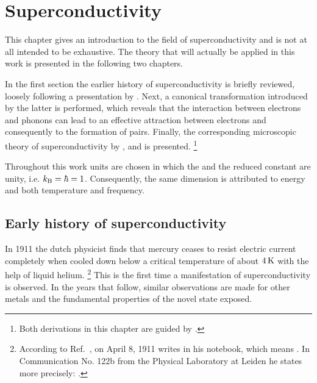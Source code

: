 
\chapter{Superconductivity}
\label{superconductivity}

This chapter gives an introduction to the field of superconductivity and is not
at all intended to be exhaustive. The theory that will actually be applied in
this work is presented in the following two chapters.

In the first section the earlier history of superconductivity is briefly
reviewed, loosely following a presentation by 
\cite{Froehlich82}. Next, a canonical transformation introduced by the latter is
performed, which reveals that the interaction between electrons and phonons can
lead to an effective attraction between electrons and consequently to the
formation of  pairs. Finally, the corresponding microscopic theory
of superconductivity by ,  and  is
presented.%
%
\footnote{Both derivations in this chapter are guided by 
\cite{Czycholl08}.}

Throughout this work units are chosen in which the  and the
reduced  constant are unity, i.e. $k \sb{\text{B}} = \hbar = 1$.
Consequently, the same dimension is attributed to energy and both temperature
and frequency.

\section{Early history of superconductivity}

In 1911 the dutch physicist  finds that mercury ceases to
resist electric current completely when cooled down below a critical temperature
of about $4 \, \mathrm K$ with the help of liquid helium.%
%
\footnote{According to Ref.~, on April 8, 1911
 writes  in his notebook, which
means . In Communication No. 122b
from the Physical Laboratory at Leiden he states more precisely: 
\cite{KamerlinghOnnes11}.}
%
This is the first time a manifestation of superconductivity is observed. In the
years that follow, similar observations are made for other metals and the
fundamental properties of the novel state exposed.

